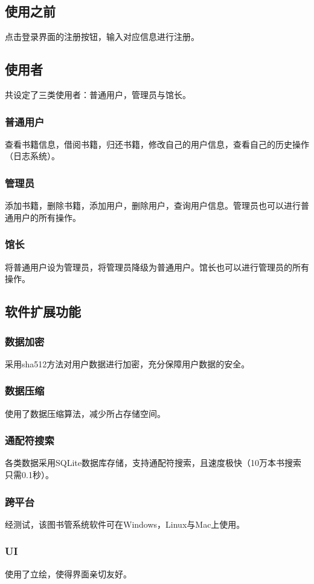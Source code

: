 \documentclass[UTF8]{ctexart}
\begin{document}
\subsection{使用之前}
\par
点击登录界面的注册按钮，输入对应信息进行注册。
\subsection{使用者}
\par
共设定了三类使用者：普通用户，管理员与馆长。
\subsubsection{普通用户}
\par
查看书籍信息，借阅书籍，归还书籍，修改自己的用户信息，查看自己的历史操作（日志系统）。
\subsubsection{管理员}
\par
添加书籍，删除书籍，添加用户，删除用户，查询用户信息。管理员也可以进行普通用户的所有操作。
\subsubsection{馆长}
\par
将普通用户设为管理员，将管理员降级为普通用户。馆长也可以进行管理员的所有操作。
\subsection{软件扩展功能}
\subsubsection{数据加密}
\par
采用sha512方法对用户数据进行加密，充分保障用户数据的安全。
\subsubsection{数据压缩}
\par
使用了数据压缩算法，减少所占存储空间。
\subsubsection{通配符搜索}
\par
各类数据采用SQLite数据库存储，支持通配符搜索，且速度极快（10万本书搜索只需0.1秒）。
\subsubsection{跨平台}
\par
经测试，该图书管系统软件可在Windows，Linux与Mac上使用。
\subsubsection{UI}
\par
使用了立绘，使得界面亲切友好。
\end{document}
